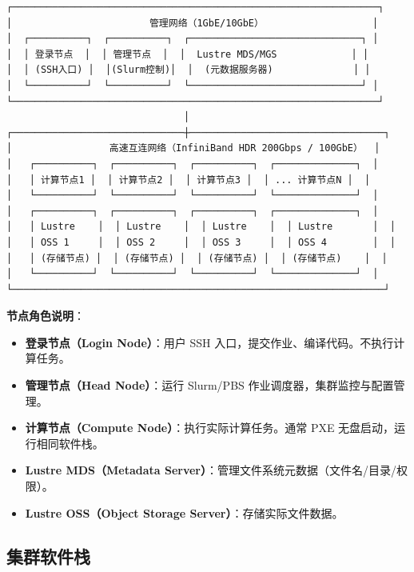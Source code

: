 \documentclass[12pt,UTF8]{ctexbook}
\begin{document}
\begin{lstlisting}
┌────────────────────────────────────────────────────────────────┐
│                        管理网络（1GbE/10GbE）                   │
│  ┌──────────┐  ┌──────────┐  ┌──────────────────────────────┐ │
│  │ 登录节点  │  │ 管理节点  │  │  Lustre MDS/MGS             │ │
│  │ (SSH入口) │  │(Slurm控制)│  │  (元数据服务器)              │ │
│  └──────────┘  └──────────┘  └──────────────────────────────┘ │
└────────────────────────────────────────────────────────────────┘
                               │
┌──────────────────────────────┼──────────────────────────────────┐
│                 高速互连网络（InfiniBand HDR 200Gbps / 100GbE）  │
│   ┌──────────┐  ┌──────────┐  ┌──────────┐  ┌──────────────┐  │
│   │ 计算节点1 │  │ 计算节点2 │  │ 计算节点3 │  │ ... 计算节点N │  │
│   └──────────┘  └──────────┘  └──────────┘  └──────────────┘  │
│   ┌──────────┐  ┌──────────┐  ┌──────────┐  ┌──────────────┐  │
│   │ Lustre    │  │ Lustre    │  │ Lustre    │  │ Lustre       │  │
│   │ OSS 1     │  │ OSS 2     │  │ OSS 3     │  │ OSS 4        │  │
│   │ (存储节点) │  │ (存储节点) │  │ (存储节点) │  │ (存储节点)    │  │
│   └──────────┘  └──────────┘  └──────────┘  └──────────────┘  │
└─────────────────────────────────────────────────────────────────┘
\end{lstlisting}

\textbf{节点角色说明}：

\begin{itemize}
    \item \textbf{登录节点（Login Node）}：用户 SSH 入口，提交作业、编译代码。不执行计算任务。
    \item \textbf{管理节点（Head Node）}：运行 Slurm/PBS 作业调度器，集群监控与配置管理。
    \item \textbf{计算节点（Compute Node）}：执行实际计算任务。通常 PXE 无盘启动，运行相同软件栈。
    \item \textbf{Lustre MDS（Metadata Server）}：管理文件系统元数据（文件名/目录/权限）。
    \item \textbf{Lustre OSS（Object Storage Server）}：存储实际文件数据。
\end{itemize}

\subsection{集群软件栈}
\end{document}
